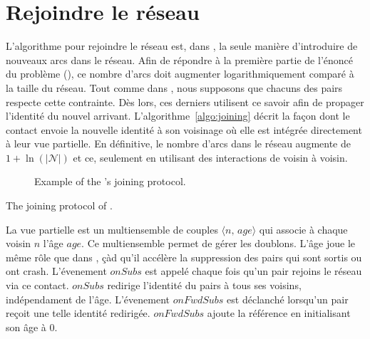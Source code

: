 \section{Rejoindre le réseau}

L'algorithme pour rejoindre le réseau est, dans \SPRAY, la seule manière
d'introduire de nouveaux arcs dans le réseau. Afin de répondre à la première
partie de l'énoncé du problème (\REF), ce nombre d'arcs doit augmenter
logarithmiquement comparé à la taille du réseau. Tout comme dans \SCAMP, nous
supposons que chacuns des pairs respecte cette contrainte. Dès lors, ces
derniers utilisent ce savoir afin de propager l'identité du nouvel
arrivant. L'algorithme~\ref{algo:joining} décrit la façon dont le contact envoie
la nouvelle identité à son voisinage où elle est intégrée directement à leur vue
partielle. En définitive, le nombre d'arcs dans le réseau augmente de
$1+\ln(|\mathcal{N}|)$ et ce, seulement en utilisant des interactions de voisin
à voisin.

\begin{figure*}
  \centering
  \hspace{10pt}
  \hspace{10pt}
  \caption{\label{net:fig:joiningexample}Example of the \SPRAY's joining
    protocol.}
\end{figure*}

\begin{algorithm}

\caption{\label{net:algo:joining}The joining protocol of \SPRAY.}
\end{algorithm}

La vue partielle est un multiensemble de couples $\langle n,\, age\rangle$ qui
associe à chaque voisin $n$ l'âge $age$. Ce multiensemble permet de gérer les
doublons. L'âge joue le même rôle que dans \CYCLON, çàd qu'il accélère la
suppression des pairs qui sont sortis ou ont crash. L'évenement $onSubs$ est
appelé chaque fois qu'un pair rejoins le réseau via ce contact. $onSubs$
redirige l'identité du pairs à tous ses voisins, indépendament de
l'âge. L'évenement $onFwdSubs$ est déclanché lorsqu'un pair reçoit une telle
identité redirigée. $onFwdSubs$ ajoute la référence en initialisant son âge à
$0$.

